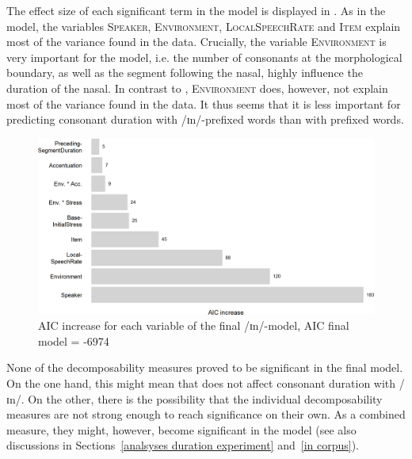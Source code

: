 The effect size of each significant term in the model is displayed in . As in the model, the variables \textsc{Speaker}, \textsc{Environment}, \textsc{LocalSpeechRate} and \textsc{Item} explain most of the variance found in the data. Crucially, the variable \textsc{Environment} is very important for the model, i.e. the number of consonants at the morphological boundary, as well as the segment following the nasal, highly influence the duration of the nasal. In contrast to , \textsc{Environment} does, however, not explain most of the variance found in the data. It thus seems that it is less important for predicting consonant duration with /ɪn/-prefixed words than with prefixed words. 


\begin{figure}
	\includegraphics[scale=0.7]{images/Experiment/AICdecreaseInComplex.png}
	\caption{AIC increase for each variable of the final /ɪn/-model, AIC final model = -6974}
	\label{fig:Effect sizes InComplex Exp}
\end{figure}



None of the decomposability measures proved to be significant in the final model. On the one hand, this might mean that  does not affect consonant duration with /ɪn/. On the other, there is the possibility that the individual decomposability measures are not strong enough to reach significance on their own. As a combined  measure, they might, however, become significant in the model (see also discussions in Sections~\ref{analsyses duration experiment} and~\ref{in corpus}).


